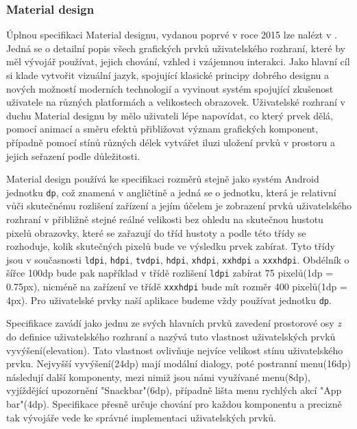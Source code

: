 \documentclass[czech,master,public,dept460,male,java,cpdeclaration]{diploma}
\begin{document}
\subsubsection{Material design}
Úplnou specifikaci Material designu, vydanou poprvé v roce 2015 lze nalézt v \cite{materialdesign}.
Jedná se o detailní popis všech
grafických prvků uživatelského rozhraní, které by měl vývojář používat, jejich chování, vzhled i vzájemnou
 interakci. Jako hlavní cíl si klade vytvořit vizuální jazyk, spojující klasické principy dobrého designu
  a nových možností moderních technologií a vyvinout systém spojující zkušenost uživatele na různých
  platformách a velikostech obrazovek\cite{materialdesign}. Uživatelské rozhraní v duchu Material designu
  by mělo uživateli lépe napovídat, co který prvek dělá, pomocí animací a směru efektů přibližovat
  význam grafických komponent, případně pomocí stínů různých délek vytvářet iluzi uložení prvků
  v prostoru a jejich seřazení podle důležitosti.

  Material design používá ke specifikaci rozměrů
  stejně jako systém Android jednotku \texttt{dp}, což znamená v angličtině  a jedná se o jednotku, která je relativní vůči skutečnému rozlišení zařízení a jejím účelem
  je zobrazení prvků uživatelského rozhraní v přibližně stejné reálné velikosti bez ohledu na skutečnou
  hustotu pixelů obrazovky, které se zařazují do tříd hustoty a podle této třídy se rozhoduje,
  kolik skutečných pixelů bude ve výsledku prvek zabírat. Tyto třídy jsou v současnosti
  \texttt{ldpi}, \texttt{hdpi}, \texttt{tvdpi}, \texttt{hdpi}, \texttt{xhdpi}, \texttt{xxhdpi} a \texttt{xxxhdpi}.
  Obdélník o šířce 100dp bude pak například v třídě rozlišení \texttt{ldpi} zabírat 75 pixelů(1dp = 0.75px),
  nicméně na zařízení ve třídě \texttt{xxxhdpi} bude mít rozměr 400 pixelů(1dp = 4px). Pro uživatelské
  prvky naší aplikace budeme vždy používat jednotku \texttt{dp}.

  Specifikace zavádí jako jednu ze svých hlavních prvků zavedení prostorové osy \textit{z} do
  definice uživatelského rozhraní a nazývá tuto vlastnost uživatelských prvků vyvýšení(elevation)\cite{materialdesign}.
  Tato vlastnost ovlivňuje nejvíce velikost stínu uživatelského prvku. Nejvyšší vyvýšení(24dp)
  mají modální dialogy, poté postranní menu(16dp) následují další komponenty, mezi nimiž jsou námi využívané
  menu(8dp), vyjíždějící upozornění "Snackbar"(6dp), případně lišta menu rychlých akcí "App bar"(4dp)\cite{materialdesign}.
  Specifikace přesně určuje chování pro každou komponentu a precizně tak vývojáře vede ke správné
  implementaci uživatelských prvků.
\end{document}
